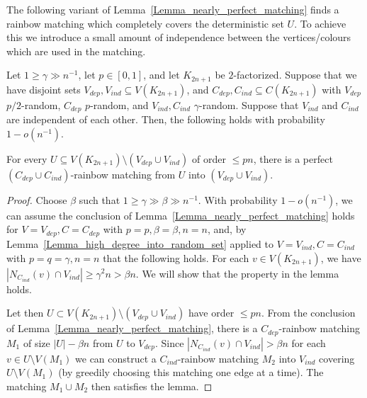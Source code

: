 The following variant of Lemma~\ref{Lemma_nearly_perfect_matching} finds a rainbow matching which completely covers the deterministic set $U$. To achieve this we introduce a small amount of independence between the vertices/colours which are used in the matching. 
\begin{lemma}\label{Lemma_sat_matching_random_embedding}
Let $1\geq \gamma \gg n^{-1}$, let $p\in[0,1]$,  and let  $K_{2n+1}$ be $2$-factorized.
Suppose that we have disjoint sets $V_{dep}, V_{ind}\subseteq V(K_{2n+1})$, and $C_{dep}, C_{ind}\subseteq C(K_{2n+1})$  with $V_{dep}$ $p/2$-random, $C_{dep}$ $p$-random, and $V_{ind}, C_{ind}$ $\gamma$-random. Suppose that $V_{ind}$ and $C_{ind}$ are independent of each other. Then, the following holds with  probability $1-o(n^{-1})$.

For every $U\subseteq V(K_{2n+1})\setminus (V_{dep}\cup V_{ind})$ of order $\leq p n$, there is a perfect $(C_{dep}\cup C_{ind})$-rainbow matching from $U$ into $(V_{dep}\cup V_{ind})$.
\end{lemma}
\begin{proof}
Choose $\beta$ such that $1\geq \gamma \gg \beta\gg n^{-1}$.
With  probability $1-o(n^{-1})$, we can assume the conclusion of
Lemma~\ref{Lemma_nearly_perfect_matching} holds for $V=V_{dep}, C=C_{dep}$ with $p=p, \beta=\beta, n=n$, and, by Lemma~\ref{Lemma_high_degree_into_random_set} applied to $V=V_{ind}, C=C_{ind}$ with $p=q=\gamma, n=n$ that the following holds. For each $v\in V(K_{2n+1})$, we have $|N_{C_{ind}}(v) \cap V_{ind}| \geq \gamma^2n>\beta n$. We will show that the property in the lemma holds. 

Let then $U\subset V(K_{2n+1})\setminus (V_{dep}\cup V_{ind})$ have order $\leq p n$.
From the conclusion of Lemma~\ref{Lemma_nearly_perfect_matching}, there is  a $C_{dep}$-rainbow matching $M_1$ of size $|U|-\beta n$ from $U$ to $V_{dep}$. 
Since $|N_{C_{ind}}(v) \cap V_{ind}| >\beta n$ for each $v\in U\setminus V(M_1)$ we can construct a $C_{ind}$-rainbow matching $M_2$ into $V_{ind}$ covering $U\setminus V(M_1)$ (by greedily choosing this matching one edge at a time). The matching $M_1\cup M_2$ then satisfies the lemma.
\end{proof}
 

